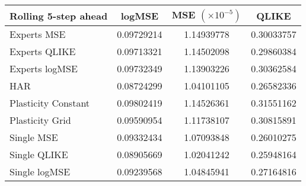 
\begin{tabular}{l|c|c|c}
Rolling 5-step ahead     & logMSE & MSE $(\times 10^{-5})$ & QLIKE \\\hline
Experts MSE & 0.09729214 & 1.14939778 & 0.30033757\\ 
Experts QLIKE & 0.09713321 & 1.14502098 & 0.29860384\\ 
Experts logMSE & 0.09732349 & 1.13903226 & 0.30362584\\ 
HAR & 0.08724299 & 1.04101105 & 0.26582336\\ 
Plasticity Constant & 0.09802419 & 1.14526361 & 0.31551162\\ 
Plasticity Grid & 0.09590954 & 1.11738107 & 0.30815891\\ 
Single MSE & 0.09332434 & 1.07093848 & 0.26010275\\ 
Single QLIKE & 0.08905669 & 1.02041242 & 0.25948164\\ 
Single logMSE & 0.09239568 & 1.04845941 & 0.27164816\\ 
\end{tabular}
